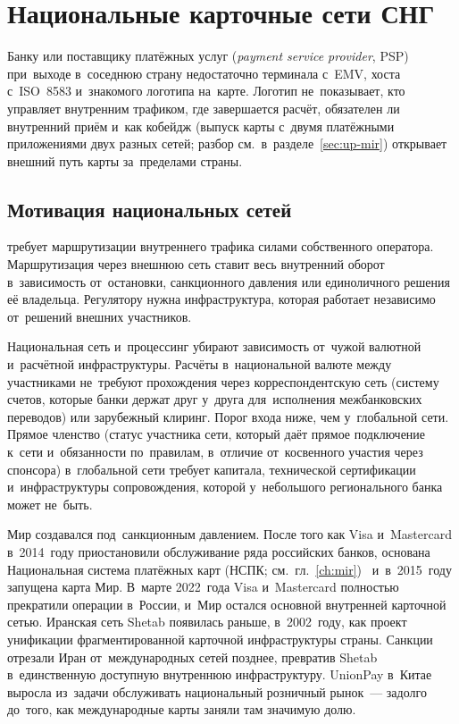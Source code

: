 
\chapter{Национальные карточные сети СНГ}\label{ch:regional-schemes}
Банку или поставщику платёжных услуг (\textit{payment service provider}, PSP)
при~выходе в~соседнюю страну недостаточно терминала с~EMV, хоста с~ISO~8583
и~знакомого логотипа на~карте. Логотип не~показывает, кто управляет внутренним
трафиком, где завершается расчёт, обязателен ли внутренний приём и~как
кобейдж (выпуск карты с~двумя платёжными приложениями двух разных сетей;
разбор см.~в~разделе~\ref{sec:up-mir}) открывает внешний путь карты
за~пределами страны.

\section{Мотивация национальных сетей}\label{sec:regional-why}

требует маршрутизации внутреннего трафика силами собственного оператора.
Маршрутизация через внешнюю сеть ставит весь внутренний оборот в~зависимость
от~остановки, санкционного давления или единоличного решения её владельца.
Регулятору нужна инфраструктура, которая работает независимо от~решений внешних
участников.

Национальная сеть и~процессинг убирают зависимость от~чужой валютной и~расчётной
инфраструктуры. Расчёты в~национальной валюте между участниками не~требуют
прохождения через корреспондентскую сеть (систему счетов, которые банки держат
друг у~друга для~исполнения межбанковских переводов) или зарубежный клиринг.
Порог входа ниже, чем у~глобальной сети. Прямое членство (статус участника
  сети, который даёт прямое подключение к~сети и~обязанности по~правилам,
в~отличие от~косвенного участия через спонсора) в~глобальной сети требует
капитала, технической сертификации и~инфраструктуры сопровождения, которой
у~небольшого регионального банка может не~быть.

Мир создавался под~санкционным давлением. После того как Visa и~Mastercard
в~2014~году приостановили обслуживание ряда российских банков, основана
Национальная система платёжных карт (НСПК;
см.~гл.~\ref{ch:mir})~\cite{nspk-about-company} и~в~2015~году запущена карта
Мир. В~марте 2022~года Visa и~Mastercard полностью прекратили операции
в~России, и~Мир остался основной внутренней карточной сетью. Иранская сеть
Shetab появилась раньше, в~2002~году, как проект унификации фрагментированной
карточной инфраструктуры страны. Санкции отрезали Иран от~международных сетей
позднее, превратив Shetab в~единственную доступную внутреннюю инфраструктуру.
UnionPay в~Китае выросла из~задачи обслуживать национальный розничный рынок~---
задолго до~того, как международные карты заняли там значимую долю.


